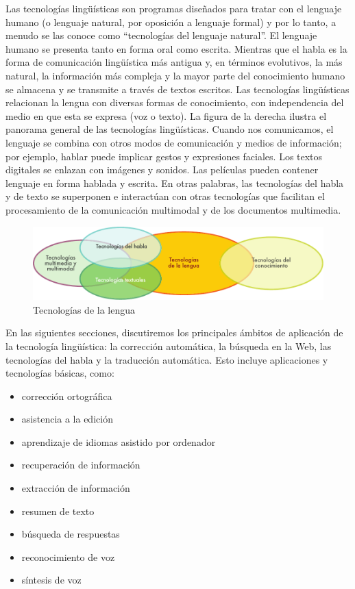 \begin{multicols}{2}

Las tecnologías lingüísticas son programas diseñados para tratar con el lenguaje humano (o lenguaje natural, por oposición a lenguaje formal) y por lo tanto, a menudo se las conoce como "`tecnologías del lenguaje natural"'. El lenguaje humano se presenta tanto en forma oral como escrita. Mientras que el habla es la forma de comunicación lingüística más antigua y, en términos evolutivos, la más natural, la información más compleja y la mayor parte del conocimiento humano se almacena y se transmite a través de textos escritos. Las tecnologías lingüísticas relacionan la lengua con diversas formas de conocimiento, con independencia del medio en que esta se expresa (voz o texto). La figura de la derecha ilustra el panorama general de las tecnologías lingüísticas. Cuando nos comunicamos, el lenguaje se combina con otros modos de comunicación y medios de información; por ejemplo, hablar puede implicar gestos y expresiones faciales. Los textos digitales se enlazan con imágenes y sonidos. Las películas pueden contener lenguaje en forma hablada y escrita. En otras palabras, las tecnologías del habla y de texto se superponen e interactúan con otras tecnologías que facilitan el procesamiento de la comunicación multimodal y de los documentos multimedia.

\begin{figure}[htb]
  \center
  \includegraphics[width=\textwidth]{../_media/spanish/language_technologies}
  \caption{Tecnologías de la lengua}
  \label{fig:ltincontext_de}
\end{figure}

En las siguientes secciones, discutiremos los principales ámbitos de aplicación de la tecnología lingüística: la corrección automática, la búsqueda en la Web, las tecnologías del habla y la traducción automática. Esto incluye aplicaciones y tecnologías básicas, como:

\begin{itemize}
  \item	corrección ortográfica
  \item	asistencia a la edición
  \item	aprendizaje de idiomas asistido por ordenador
  \item	recuperación de información
  \item	extracción de información
  \item	resumen de texto
  \item	búsqueda de respuestas
  \item	reconocimiento de voz
  \item	síntesis de voz
\end{itemize}


\end{multicols}
